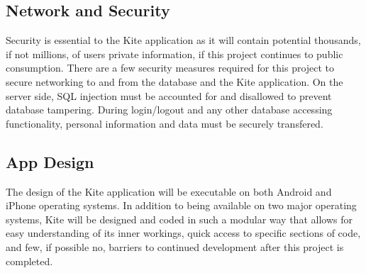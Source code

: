 \documentclass[letterpaper, 10, draftclsnofoot, onecolumn]{IEEEtran}
\begin{document}
\subsection{Network and Security}
	Security is essential to the Kite application as it will contain potential thousands, if not millions, of users private information, if this project continues to public consumption. There are a few security measures required for this project to secure networking to and from the database and the Kite application. On the server side, SQL injection must be accounted for and disallowed to prevent database tampering. During login/logout and any other database accessing functionality, personal information and data must be securely transfered.   

\subsection{App Design}
\indent The design of the Kite application will be executable on both Android and iPhone operating systems. In addition to being available on two major operating systems, Kite will be  designed and coded in such a modular way that allows for easy understanding of its inner workings, quick access to specific sections of code, and few, if possible no, barriers to continued development after this project is completed.
\end{document}
